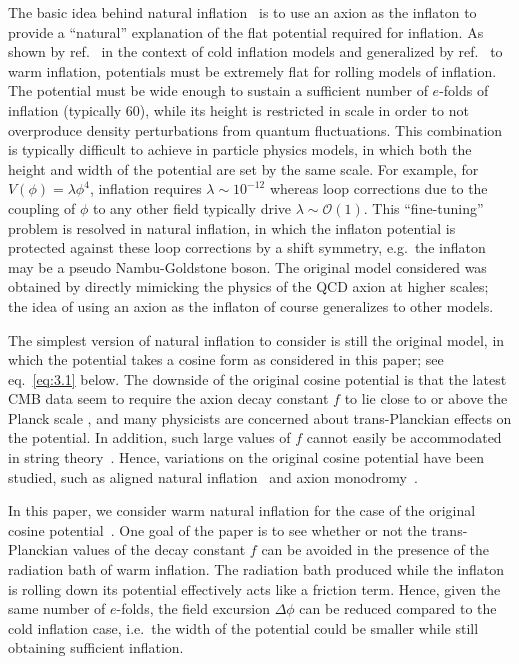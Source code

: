 \documentclass[a4paper,11pt]{article}
\begin{document}
The basic idea behind natural inflation~\cite{Freese:1990rb} is to use an axion as the inflaton to provide a ``natural'' explanation of the flat potential required for inflation. As shown by ref.~\cite{Adams:1990pn} in the context of cold inflation models and generalized by ref.~\cite{Montefalcone:2022owy} to warm inflation, potentials must be extremely flat for rolling models of inflation. The potential must be wide enough to sustain a sufficient number of $e$-folds of inflation (typically 60), while its height is restricted in scale in order to not overproduce density perturbations from quantum fluctuations. This combination is typically difficult to achieve in particle physics models, in which both the height and width of the potential are set by the same scale. For example, for $V(\phi) = \lambda \phi^4$, inflation requires $\lambda \sim 10^{-12}$ whereas loop corrections due to the coupling of $\phi$ to any other field typically drive $\lambda \sim \mathcal{O}(1)$. This ``fine-tuning'' problem is resolved in natural inflation, in which the inflaton potential is protected against these loop corrections by a shift symmetry, e.g.\ the inflaton may be a pseudo Nambu-Goldstone boson. The original model considered was obtained by directly mimicking the physics of the QCD axion at higher scales; the idea of using an axion as the inflaton of course generalizes to other models. 

The simplest version of natural inflation to consider is still the original model, in which the potential takes a cosine form as considered in this paper; see eq.~\eqref{eq:3.1} below. The downside of the original cosine potential is that the latest CMB data seem to require the axion decay constant $f$ to lie close to or above the Planck scale \cite{Freese:2014nla,Stein:2021uge}, and many physicists are concerned about trans-Planckian effects on the potential. In addition, such large values of $f$ cannot easily be accommodated in string theory~\cite{Banks:2003sx}. Hence, variations on the original cosine potential have been studied, such as aligned natural inflation~\cite{Kim:2004rp} and axion monodromy~\cite{Silverstein:2008sg}.

In this paper, we consider warm natural inflation for the case of the original cosine potential~\cite{Mishra:2011vh, Visinelli:2011jy}. One goal of the paper is to see whether or not the trans-Planckian values of the decay constant $f$ can be avoided in the presence of the radiation bath of warm inflation. The radiation bath produced while the inflaton is rolling down its potential effectively acts like a friction term. Hence, given the same number of $e$-folds,
the field excursion $\Delta \phi$ can be reduced compared to the cold inflation case,
i.e.\ the width of the potential could be smaller while still obtaining sufficient inflation.
\end{document}
